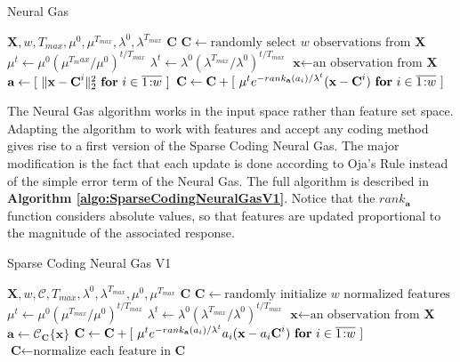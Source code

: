 \documentclass[12pt,a4paper,oneside,english]{UPBThesis}
\newcommand{\hcrange}[2]{\overline{{#1}\colon\!\!{#2}}}
\begin{document}
\begin{algorithm}
\caption{Neural Gas}
\label{algo:NeuralGas}
\begin{algorithmic}
\Require $\textbf{X},w,T_{max},\mu^0,\mu^{T_{max}},\lambda^0,\lambda^{T_{max}}$
\Ensure $\textbf{C}$
\State $\textbf{C} \gets \mbox{randomly select $w$ observations from $\textbf{X}$}$
\For {$t = \hcrange{1}{T_{max}}$}
\State $\mu^t \gets \mu^0 (\mu^{T_max} / \mu^0)^{t / T_{max}}$ 
\State $\lambda^t \gets \lambda^0 (\lambda^{T_{max}} / \lambda^0)^{t / T_{max}}$ 
\State $\textbf{x} \gets \text{an observation from $\textbf{X}$}$
\State $\textbf{a} \gets [ ~ \|\textbf{x} - \textbf{C}^i\|_2^2 ~ \mbox{\textbf{for} $i \in \hcrange{1}{w}$} ~ ]$
\State $\textbf{C} \gets \textbf{C} + [ ~ \mu^t e^{-rank_{\textbf{a}}(a_i) / \lambda^t} (\textbf{x} - \textbf{C}^i) ~ \mbox{\textbf{for} $i \in \hcrange{1}{w}$} ~ ]$
\EndFor
\end{algorithmic}
\end{algorithm}

The Neural Gas algorithm works in the input space rather than feature set space. Adapting the algorithm to work with features and accept any coding method gives rise to a first version of the Sparse Coding Neural Gas. The major modification is the fact that each update is done according to Oja's Rule \cite{oja-rule} instead of the simple error term of the Neural Gas. The full algorithm is described in \textbf{Algorithm \ref{algo:SparseCodingNeuralGasV1}}. Notice that the $rank_{\textbf{a}}$ function considers absolute values, so that features are updated proportional to the magnitude of the associated response.

\begin{algorithm}
\caption{Sparse Coding Neural Gas V1}
\label{algo:SparseCodingNeuralGasV1}
\begin{algorithmic}
\Require $\textbf{X},w,\mathcal{C},T_{max},\lambda^0,\lambda^{T_{max}},\mu^0,\mu^{T_{max}}$
\Ensure $\textbf{C}$
\State $\textbf{C} \gets \mbox{randomly initialize $w$ normalized features}$
\For {$t = \hcrange{1}{T_{max}}$}
\State $\mu^t \gets \mu^0 (\mu^{T_{max}} / \mu^0)^{t / T_{max}}$  
\State $\lambda^t \gets \lambda^0 (\lambda^{T_{max}} / \lambda^0)^{t / T_{max}}$ 
\State $\textbf{x} \gets \text{an observation from $\textbf{X}$}$
\State $\textbf{a} \gets \mathcal{C}_{\textbf{C}}\{ \textbf{x} \}$
\State $\textbf{C} \gets \textbf{C} + [ ~ \mu^t e^{-rank_{\textbf{a}}(a_i) / \lambda^t} a_i (\textbf{x} - a_i \textbf{C}^i) ~ \mbox{\textbf{for} $i \in \hcrange{1}{w}$} ~ ]$
\State $\textbf{C} \gets \mbox{normalize each feature in $\textbf{C}$}$
\EndFor
\end{algorithmic}
\end{algorithm}
\end{document}
